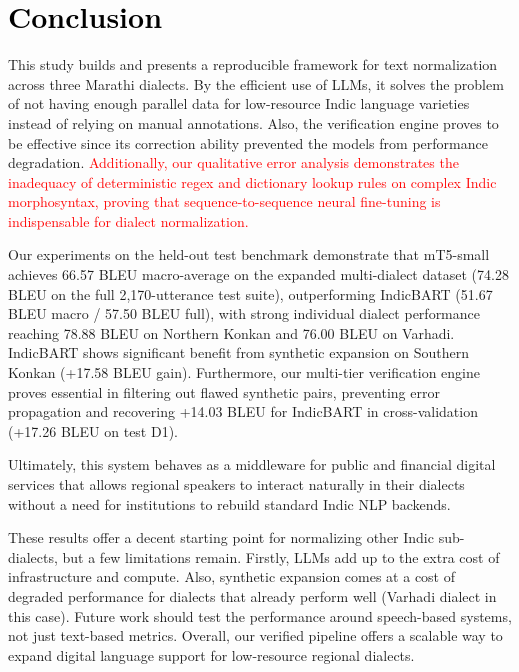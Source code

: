 \documentclass[11pt, a4paper]{article}
\begin{document}
\section{\textcolor{black}{Conclusion}}

This study builds and presents a reproducible framework for text normalization across three Marathi dialects. 
By the efficient use of LLMs, it solves the problem of not having enough parallel data for low-resource Indic language varieties instead of relying on manual annotations.
Also, the verification engine proves to be effective since its correction ability prevented the models from performance degradation.
\textcolor{red}{Additionally, our qualitative error analysis demonstrates the inadequacy of deterministic regex and dictionary lookup rules on complex Indic morphosyntax, proving that sequence-to-sequence neural fine-tuning is indispensable for dialect normalization.}

Our experiments on the held-out test benchmark demonstrate that mT5-small achieves 66.57 BLEU macro-average on the expanded multi-dialect dataset (74.28 BLEU on the full 2,170-utterance test suite), outperforming IndicBART (51.67 BLEU macro / 57.50 BLEU full), with strong individual dialect performance reaching 78.88 BLEU on Northern Konkan and 76.00 BLEU on Varhadi. IndicBART shows significant benefit from synthetic expansion on Southern Konkan (+17.58 BLEU gain). Furthermore, our multi-tier verification engine proves essential in filtering out flawed synthetic pairs, preventing error propagation and recovering +14.03 BLEU for IndicBART in cross-validation (+17.26 BLEU on test D1).

Ultimately, this system behaves as a middleware for public and financial digital services that allows regional speakers to interact naturally in their dialects without a need for institutions to rebuild standard Indic NLP backends.

These results offer a decent starting point for normalizing other Indic sub-dialects, but a few limitations remain. 
Firstly, LLMs add up to the extra cost of infrastructure and compute. 
Also, synthetic expansion comes at a cost of degraded performance for dialects that already perform well (Varhadi dialect in this case).
Future work should test the performance around speech-based systems, not just text-based metrics. 
Overall, our verified pipeline offers a scalable way to expand digital language support for low-resource regional dialects.

\begingroup
\fontsize{8pt}{10pt}\selectfont

\endgroup

\enddocument
\end{document}
